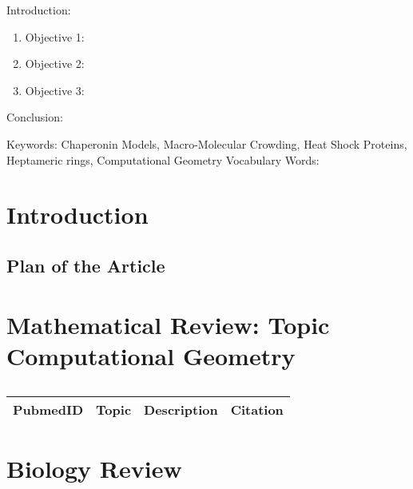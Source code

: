 

\twocolumn
\scriptsize
\begin{frontmatter}
		\title{}
		\author{}
		\address{The Mathematical Learning Space}
\end{frontmatter}	

Introduction:
\begin{enumerate}
\item Objective 1:
\item Objective 2:
\item Objective 3:
\end{enumerate}
Conclusion:

Keywords: Chaperonin Models, Macro-Molecular Crowding, Heat Shock Proteins, Heptameric rings, Computational Geometry
Vocabulary Words:

\section{Introduction}



\subsection{Plan of the Article}

\begin{enumerate}
\end{enumerate}

\section{Mathematical Review: Topic Computational Geometry}

\centering	
\begin{table}[H]\tiny
	\caption{}	
	\begin{tabular}{rp{1cm}|p{4cm}|l}
		\hline	
		PubmedID & Topic & Description & Citation \\
		\hline 
		\hline 
	\end{tabular}
\end{table}

\section{Biology Review}

